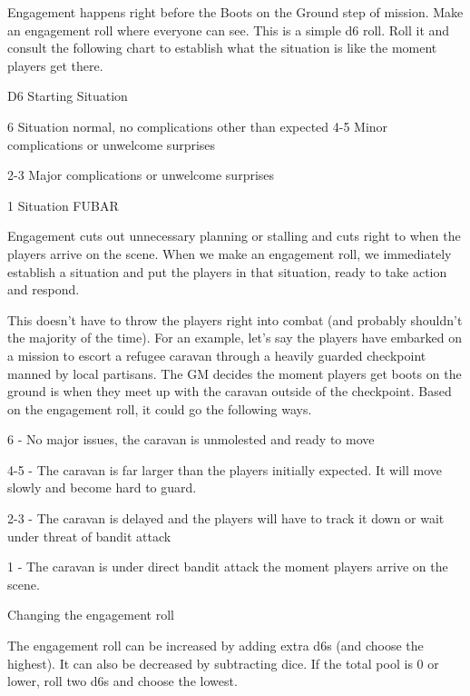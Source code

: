                                                                                                          


Engagement happens right before the Boots on the Ground step of mission. Make an  
engagement roll where everyone can see. This is a simple d6 roll. Roll it and consult the  
following chart to establish what the situation is like the moment players get there.
 

 D6                                                    Starting Situation 

 6                                                     Situation normal, no complications other than  
                                                       expected 
 4-5                                                   Minor complications or unwelcome surprises 

 2-3                                                   Major complications or unwelcome surprises 

 1                                                     Situation FUBAR 

Engagement cuts out unnecessary planning or stalling and cuts right to when the players arrive  
on the scene. When we make an engagement roll, we immediately establish a situation and put  
the players in that situation, ready to take action and respond. 
 

This doesn’t have to throw the players right into combat (and probably shouldn’t the majority of  
the time). For an example, let’s say the players have embarked on a mission to escort a refugee  
caravan through a heavily guarded checkpoint manned by local partisans. The GM decides the  
moment players get boots on the ground is when they meet up with the caravan outside of the  
checkpoint. Based on the engagement roll, it could go the following ways.
 

6 - No major issues, the caravan is unmolested and ready to move
 
4-5 - The caravan is far larger than the players initially expected. It will move slowly and become  
hard to guard.
 
2-3 - The caravan is delayed and the players will have to track it down or wait under threat of  
bandit attack
 
1 - The caravan is under direct bandit attack the moment players arrive on the scene.
 

                                    Changing the engagement roll
 

The engagement roll can be increased by adding extra d6s (and choose the highest). It can also  
be decreased by subtracting dice. If the total pool is 0 or lower, roll two d6s and choose the  
lowest.
 

